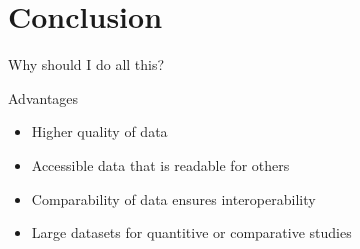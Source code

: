 \section{Conclusion}
\begin{frame}{Why should I do all this?}
    \begin{block}{Advantages}
        \begin{itemize}
            \item Higher quality of data \\
            \item Accessible data that is readable for others \\
            \item Comparability of data ensures interoperability \\
            \item Large datasets for quantitive or comparative studies
        \end{itemize}
    \end{block}
\end{frame}

